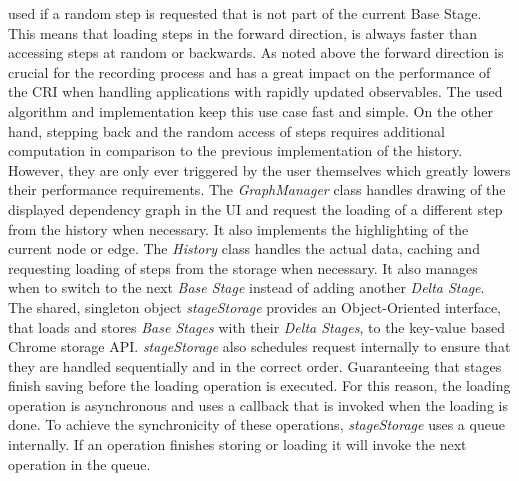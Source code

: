 used if a random step is requested that is not part of the current Base Stage. This means that loading steps in the forward direction, is always faster than accessing steps at random or backwards. As noted above the forward direction is crucial for the recording process and has a great impact on the performance of the CRI when handling applications with rapidly updated observables. The used algorithm and implementation keep this use case fast and simple. On the other hand, stepping back and the random access of steps requires additional computation in comparison to the previous implementation of the history. However, they are only ever triggered by the user themselves which greatly lowers their performance requirements.
The \emph{GraphManager} class handles drawing of the displayed dependency graph in the UI and request the loading of a different step from the history when necessary. It also implements the highlighting of the current node or edge. The \emph{History} class handles the actual data, caching and requesting loading of steps from the storage when necessary. It also manages when to switch to the next \emph{Base Stage} instead of adding another \emph{Delta Stage}. The shared, singleton object \emph{stageStorage} provides an Object-Oriented interface, that loads and stores \emph{Base Stages} with their \emph{Delta Stages}, to the key-value based Chrome storage API. \emph{stageStorage} also schedules request internally to ensure that they are handled sequentially and in the correct order. Guaranteeing that stages finish saving before the loading operation is executed. For this reason, the loading operation is asynchronous and uses a callback that is invoked when the loading is done. To achieve the synchronicity of these operations, \emph{stageStorage} uses a queue internally. If an operation finishes storing or loading it will invoke the next operation in the queue.	

